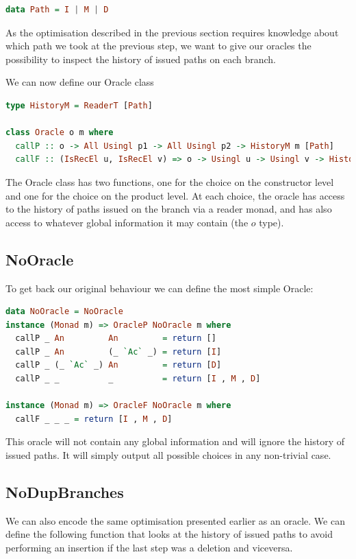 \documentclass[11pt]{article}
\begin{document}
\begin{lstlisting}[language=haskell]
  data Path = I | M | D 
\end{lstlisting}

As the optimisation described in the previous section requires knowledge about 
which path we took at the previous step, we want to give our oracles the 
possibility to inspect the history of issued paths on each branch.

We can now define our Oracle class

\begin{lstlisting}[language=haskell]
type HistoryM = ReaderT [Path]

class Oracle o m where
  callP :: o -> All Usingl p1 -> All Usingl p2 -> HistoryM m [Path]
  callF :: (IsRecEl u, IsRecEl v) => o -> Usingl u -> Usingl v -> HistoryM m [Path]
\end{lstlisting}

The Oracle class has two functions, one for the choice on the constructor level 
and one for the choice on the product level. At each choice, the oracle has 
access to the history of paths issued on the branch via a reader monad, and 
has also access to whatever global information it may contain (the $o$ type).
 
 \subsection{NoOracle}
To get back our original behaviour we can define the most simple Oracle:

\begin{lstlisting}[language=haskell]
data NoOracle = NoOracle
instance (Monad m) => OracleP NoOracle m where
  callP _ An         An         = return []
  callP _ An         (_ `Ac` _) = return [I]
  callP _ (_ `Ac` _) An         = return [D]
  callP _ _          _          = return [I , M , D]

instance (Monad m) => OracleF NoOracle m where
  callF _ _ _ = return [I , M , D]
\end{lstlisting}

This oracle will not contain any global information and will ignore the history 
of issued paths. It will simply output all possible choices in any non-trivial 
case.

\subsection{NoDupBranches}
We can also encode the same optimisation presented earlier as an oracle. We can 
define the following function that looks at the history of issued paths to avoid 
performing an insertion if the last step was a deletion and viceversa.
\end{document}
